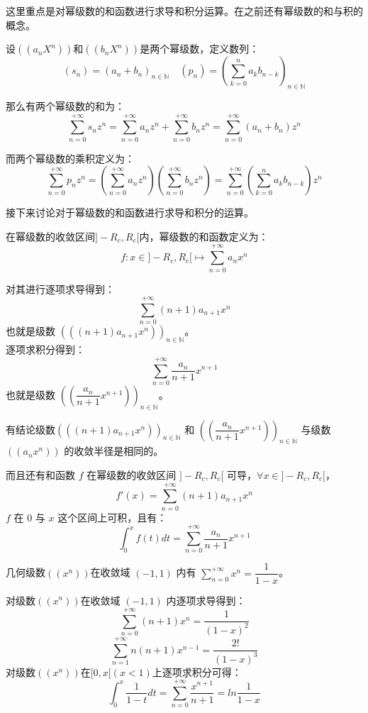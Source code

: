 \documentclass[math_note.tex]{subfiles}
\begin{document}
这里重点是对幂级数的和函数进行求导和积分运算。在之前还有幂级数的和与积的概念。

\begin{newprop}[幂级数的和与积]
	设$((a_{n}X^{n}))$和$((b_{n}X^{n}))$是两个幂级数，定义数列：
	$$(s_{n})=(a_{n}+b_{n})_{n \in \mathbb{N}} \quad (p_{n})=(\sum\limits_{k=0}^{n}
	 a_{k}b_{n-k})_{n \in \mathbb{N}}$$

	那么有两个幂级数的和为：
	$$\sum\limits_{n=0}^{+\infty} s_{n}z^{n} = \sum\limits_{n=0}^{+\infty} a_{n}z^{n}
	 + \sum\limits_{n=0}^{+\infty} b_{n}z^{n} = \sum\limits_{n=0}^{+\infty} (a_{n}+b_{n})
	 z^{n}$$

	而两个幂级数的乘积定义为：
	$$\sum\limits_{n=0}^{+\infty}p_{n}z^{n} =  (\sum\limits_{n=0}^{+\infty}a_{n}z^{n})
	(\sum\limits_{n=0}^{+\infty}b_{n}z^{n}) =\sum\limits_{n=0}^{+\infty}(\sum\limits
	_{k=0}^{n} a_{k}b_{n-k})z^{n}$$

\end{newprop}

接下来讨论对于幂级数的和函数进行求导和积分的运算。

在幂级数的收敛区间$]-R_{c},R_{c}[$内，幂级数的和函数定义为：
$$f:x \in ]-R_{c},R_{c}[ \mapsto \sum\limits_{n=0}^{+\infty}a_{n}x^{n}$$
\begin{multicols}{2}
对其进行逐项求导得到：
$$ \sum\limits_{n=0}^{+\infty}(n+1)a_{n+1}x^{n} $$
也就是级数 $ (((n+1)a_{n+1}x^{n}))_{n \in \mathbb{N}} $。
\\
逐项求积分得到：
$$ \sum\limits_{n=0}^{+\infty}\dfrac{a_{n}}{n+1}x^{n+1} $$
也就是级数 $ ((\dfrac{a_{n}}{n+1}x^{n+1}))_{n \in \mathbb{N}} $。
\end{multicols}

有结论级数$ (((n+1)a_{n+1}x^{n}))_{n \in \mathbb{N}} $ 和 $ ((\dfrac{a_{n}}
{n+1}x^{n+1}))_{n \in \mathbb{N}} $ 与级数  $ ((a_{n}x^{n})) $ 的收敛半径是相同的。

而且还有和函数 $f$ 在幂级数的收敛区间 $]-R_{c},R_{c}[$ 可导，$\forall x \in 
]-R_{c},R_{c}[$，
$$ f'(x) = \sum\limits_{n=0}^{+\infty}(n+1)a_{n+1}x^{n} $$ 
$f$ 在 $0$ 与 $x$ 这个区间上可积，且有：
$$ \int_{0}^{x}f(t)dt =  \sum\limits_{n=0}^{+\infty}\dfrac{a_{n}}{n+1}x^{n+1} $$

\begin{example}
	几何级数$ ((x^{n})) $在收敛域 $(-1,1)$ 内有 $\sum\limits_{n=0}^{+\infty}x^{n}
	 = \dfrac{1}{1-x} $。

	对级数$ ((x^{n})) $在收敛域 $(-1,1)$ 内逐项求导得到：
	$$ \sum\limits_{n=0}^{+\infty}(n+1)x^{n} = \dfrac{1}{(1-x)^{2}} $$
	$$ \sum\limits_{n=1}^{+\infty}n(n+1)x^{n-1} = \dfrac{2!}{(1-x)^{3}} $$
	对级数$ ((x^{n})) $在$[0,x[(x<1)$上逐项求积分可得：
	$$ \int_{0}^{x} \dfrac{1}{1-t} dt = \sum\limits_{n=0}^{+\infty}\dfrac{x^{n+1}}
	{n+1} = ln \dfrac{1}{1-x} $$

\end{example}
\end{document}
